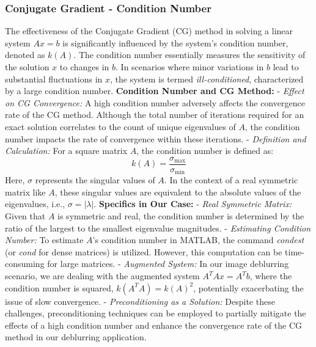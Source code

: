 \documentclass[unicode,11pt,a4paper,oneside,numbers=endperiod,openany]{scrartcl}
\begin{document}
\subsubsection{Conjugate Gradient - Condition Number}
The effectiveness of the Conjugate Gradient (CG) method in solving a linear system \( Ax = b \) is significantly influenced by the system's condition number, denoted as \( k(A) \). The condition number essentially measures the sensitivity of the solution \( x \) to changes in \( b \). In scenarios where minor variations in \( b \) lead to substantial fluctuations in \( x \), the system is termed \textit{ill-conditioned}, characterized by a large condition number.
\newline\newline
\textbf{Condition Number and CG Method:}
- \textit{Effect on CG Convergence:} A high condition number adversely affects the convergence rate of the CG method. Although the total number of iterations required for an exact solution correlates to the count of unique eigenvalues of \( A \), the condition number impacts the rate of convergence within these iterations.\newline\newline
- \textit{Definition and Calculation:} For a square matrix \( A \), the condition number is defined as:
  \[
  k(A) = \frac{\sigma_{\text{max}}}{\sigma_{\text{min}}}
  \]
  Here, \( \sigma \) represents the singular values of \( A \). In the context of a real symmetric matrix like \( A \), these singular values are equivalent to the absolute values of the eigenvalues, i.e., \( \sigma = |\lambda| \).
\newline\newline
\textbf{Specifics in Our Case:}
- \textit{Real Symmetric Matrix:} Given that \( A \) is symmetric and real, the condition number is determined by the ratio of the largest to the smallest eigenvalue magnitudes.\newline\newline
- \textit{Estimating Condition Number:} To estimate \( A \)'s condition number in MATLAB, the command \textit{condest} (or \textit{cond} for dense matrices) is utilized. However, this computation can be time-consuming for large matrices.\newline\newline
- \textit{Augmented System:} In our image deblurring scenario, we are dealing with the augmented system \( A^TAx = A^Tb \), where the condition number is squared, \( k(A^TA) = k(A)^2 \), potentially exacerbating the issue of slow convergence.\newline\newline
- \textit{Preconditioning as a Solution:} Despite these challenges, preconditioning techniques can be employed to partially mitigate the effects of a high condition number and enhance the convergence rate of the CG method in our deblurring application.
\end{document}
